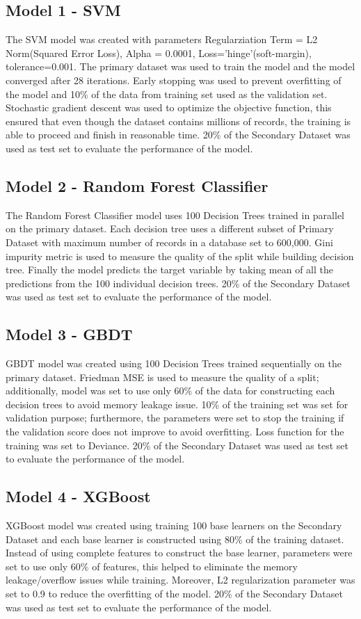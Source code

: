 \documentclass[twoside,11pt,a4paper]{article}
\begin{document}
\subsection{Model 1 - \acf{SVM}}
The \acs{SVM} model was created with parameters Regularziation Term = L2 Norm(Squared Error Loss), Alpha = 0.0001, Loss='hinge'(soft-margin), tolerance=0.001. The primary dataset was used to train the model and the model converged after 28 iterations. Early stopping was used to prevent overfitting of the model and 10\% of the data from training set used as the validation set. Stochastic gradient descent was used to optimize the objective function, this ensured that even though the dataset contains millions of records, the training is able to proceed and finish in reasonable time.  20\% of the Secondary Dataset was used as test set to evaluate the performance of the model.
\subsection{Model 2 - Random Forest Classifier}
The Random Forest Classifier model uses 100 Decision Trees trained in parallel on the primary dataset. Each decision tree uses a different subset of Primary Dataset with maximum number of records in a database set to 600,000. Gini impurity metric is used to measure the quality of the split while building decision tree. Finally the model predicts the target variable by taking mean of all the predictions from the 100 individual decision trees. 20\% of the Secondary Dataset was used as test set to evaluate the performance of the model.
\subsection{Model 3 - \acf{GBDT}}
\acs{GBDT} model was created using 100 Decision Trees trained sequentially on the primary dataset. Friedman \acf{MSE} is used to measure the quality of a split; additionally, model was set to use only 60\% of the data for constructing each decision trees to avoid memory leakage issue. 10\% of the training set was set for validation purpose; furthermore, the parameters were set to stop the training if the validation score does not improve to avoid overfitting. Loss function for the training was set to Deviance. 20\% of the Secondary Dataset was used as test set to evaluate the performance of the model.
\subsection{Model 4 - \acf{XGBoost}}
\acs{XGBoost} model was created using training 100 base learners on the Secondary Dataset and each base learner is constructed using 80\% of the training dataset. Instead of using complete features to construct the base learner, parameters were set to use only 60\% of features, this helped to eliminate the memory leakage/overflow issues while training. Moreover, L2 regularization parameter was set to 0.9 to reduce the overfitting of the model. 20\% of the Secondary Dataset was used as test set to evaluate the performance of the model.
\end{document}
